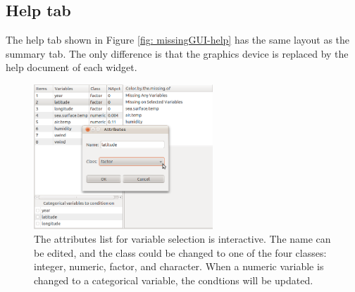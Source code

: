 \documentclass[article]{jss}
\begin{document}
\subsection{Help tab}

The help tab shown in Figure \ref{fig: missingGUI-help} has the same layout as the summary tab. The only difference is that the graphics device is replaced by the help document of each widget.

\begin{center}
%
\begin{figure}[h]
\begin{centering}
\includegraphics[width=0.6\textwidth]{Miss_fig8}
\par\end{centering}

\caption{The attributes list for variable selection is interactive. The name can be edited, and the class could be changed to one of the four classes: integer, numeric, factor, and character. When a numeric variable is changed to a categorical variable, the condtions will be updated.}
\label{fig: attributes}
\end{figure}

\par\end{center}
\end{document}
